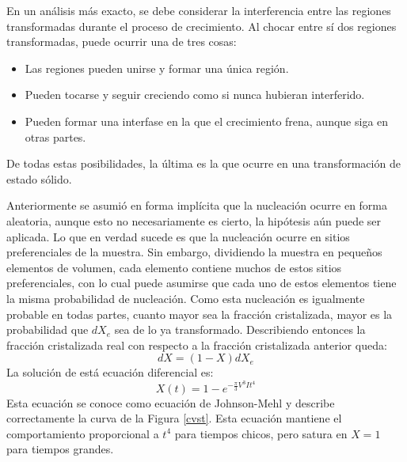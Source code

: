 \documentclass[12pt]{article}
\theoremstyle{definition}
\theoremstyle{remark}
\begin{document}
En un análisis más exacto, se debe considerar la interferencia entre las regiones transformadas durante el proceso de crecimiento. Al chocar entre sí dos regiones transformadas, puede ocurrir una de tres cosas:
\begin{itemize}
\item Las regiones pueden unirse y formar una única región.
\item Pueden tocarse y seguir creciendo como si nunca hubieran interferido.
\item Pueden formar una interfase en la que el crecimiento frena, aunque siga en otras partes.
\end{itemize}

De todas estas posibilidades, la última es la que ocurre en una transformación de estado sólido.

Anteriormente se asumió en forma implícita que la nucleación ocurre en forma aleatoria, aunque esto no necesariamente es cierto, la hipótesis aún puede ser aplicada. Lo que en verdad sucede es que la nucleación ocurre en sitios preferenciales de la muestra. Sin embargo, dividiendo la muestra en pequeños elementos de volumen, cada elemento contiene muchos de estos sitios preferenciales, con lo cual puede asumirse que cada uno de estos elementos tiene la misma probabilidad de nucleación. Como esta nucleación es igualmente probable en todas partes, cuanto mayor sea la fracción cristalizada, mayor es la probabilidad que $dX_e$ sea de lo ya transformado. Describiendo entonces la fracción cristalizada real con respecto a la fracción cristalizada anterior queda:
\begin{equation}
 dX = (1 - X)dX_e
\end{equation}
La solución de está ecuación diferencial es:
\begin{equation}
	X(t)=1-e^{-\frac{\pi}{3}V^3 I t^4}
\end{equation}
Esta ecuación se conoce como ecuación de Johnson-Mehl y describe correctamente la curva de la Figura \ref{cvst}. Esta ecuación mantiene el comportamiento proporcional a $t^4$ para tiempos chicos, pero satura en $X = 1$ para tiempos grandes.
\end{document}
